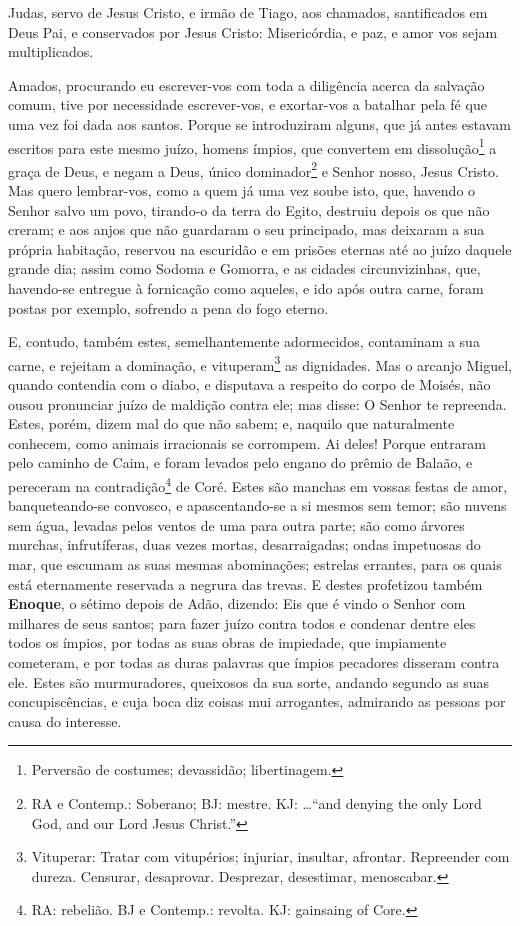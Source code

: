 
Judas, servo de Jesus Cristo, e irmão de Tiago, aos chamados,
santificados em Deus Pai, e conservados por Jesus Cristo:
Misericórdia, e paz, e amor vos sejam multiplicados.

Amados, procurando eu escrever-vos com toda a diligência acerca da
salvação comum, tive por necessidade escrever-vos, e exortar-vos a
batalhar pela fé que uma vez foi dada aos santos. Porque se
introduziram alguns, que já antes estavam escritos para este mesmo
juízo, homens ímpios, que convertem em dissolução\footnote{Perversão
de costumes; devassidão; libertinagem.} a graça de Deus, e negam a
Deus, único dominador\footnote{RA e Contemp.: Soberano; BJ: mestre.
KJ: \ldots ``and denying the only Lord God, and our Lord Jesus
Christ.''} e Senhor nosso, Jesus Cristo. Mas quero lembrar-vos,
como a quem já uma vez soube isto, que, havendo o Senhor salvo um
povo, tirando-o da terra do Egito, destruiu depois os que não
creram; e aos anjos que não guardaram o seu principado, mas
deixaram a sua própria habitação, reservou na escuridão e em prisões
eternas até ao juízo daquele grande dia; assim como Sodoma e
Gomorra, e as cidades circunvizinhas, que, havendo-se entregue à
fornicação como aqueles, e ido após outra carne, foram postas por
exemplo, sofrendo a pena do fogo eterno.

E, contudo, também estes, semelhantemente adormecidos, contaminam
a sua carne, e rejeitam a dominação, e vituperam\footnote{Vituperar:
Tratar com vitupérios; injuriar, insultar, afrontar. Repreender com
dureza. Censurar, desaprovar. Desprezar, desestimar, menoscabar.} as
dignidades. Mas o arcanjo Miguel, quando contendia com o diabo,
e disputava a respeito do corpo de Moisés, não ousou pronunciar
juízo de maldição contra ele; mas disse: O Senhor te repreenda.
Estes, porém, dizem mal do que não sabem; e, naquilo que
naturalmente conhecem, como animais irracionais se corrompem.
Ai deles! Porque entraram pelo caminho de Caim, e foram
levados pelo engano do prêmio de Balaão, e pereceram na
contradição\footnote{RA: rebelião. BJ e Contemp.: revolta. KJ:
gainsaing of Core.} de Coré. Estes são manchas em vossas
festas de amor, banqueteando-se convosco, e apascentando-se a si
mesmos sem temor; são nuvens sem água, levadas pelos ventos de uma
para outra parte; são como árvores murchas, infrutíferas, duas vezes
mortas, desarraigadas; ondas impetuosas do mar, que escumam
as suas mesmas abominações; estrelas errantes, para os quais está
eternamente reservada a negrura das trevas. E destes
profetizou também \textbf{Enoque}, o sétimo depois de Adão, dizendo:
Eis que é vindo o Senhor com milhares de seus santos; para
fazer juízo contra todos e condenar dentre eles todos os ímpios, por
todas as suas obras de impiedade, que impiamente cometeram, e por
todas as duras palavras que ímpios pecadores disseram contra ele.
Estes são murmuradores, queixosos da sua sorte, andando
segundo as suas concupiscências, e cuja boca diz coisas mui
arrogantes, admirando as pessoas por causa do interesse.

